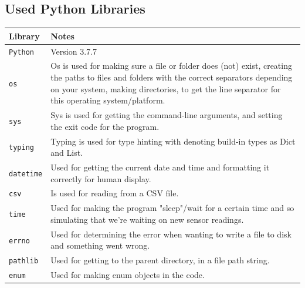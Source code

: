 \documentclass[a4paper]{article}
\newcommand{\arraystrechlength}{1.5}
\begin{document}
\subsection{Used Python Libraries}
\label{appendix:python-libs}
\begin{table}[h]
{\renewcommand{\arraystretch}{\arraystrechlength}
    \begin{tabular}{ | m{100pt} | m{230pt} | }
    
    \hline
    \rowcolor{vu-blue}
    \textcolor{vu-white}{\textbf{Library}} & \textcolor{vu-white}{\textbf{Notes}} \\ \hline
    
    \texttt{Python} &
    Version 3.7.7
    \\ \hline
    
    \texttt{os} &
    Os is used for making sure a file or folder does (not) exist, creating the paths to files and folders with the correct separators depending on your system, making directories, to get the line separator for this operating system/platform.
    \\ \hline
    
    \texttt{sys} &
    Sys is used for getting the command-line arguments, and setting the exit code for the program.
    \\ \hline
    
    \texttt{typing} &
    Typing is used for type hinting with denoting build-in types as Dict and List.
    \\ \hline
    
    \texttt{datetime} &
    Used for getting the current date and time and formatting it correctly for human display.
    \\ \hline
    
    \texttt{csv} &
    Is used for reading from a CSV file.
    \\ \hline
    
    \texttt{time} &
    Used for making the program "sleep"/wait for a certain time and so simulating that we're waiting on new sensor readings.
    \\ \hline
    
    \texttt{errno} &
    Used for determining the error when wanting to write a file to disk and something went wrong.
    \\ \hline
    
    \texttt{pathlib} &
    Used for getting to the parent directory, in a file path string.
    \\ \hline
    
    \texttt{enum} &
    Used for making enum objects in the code.
    \\ \hline
    
    \end{tabular}
}
\end{table}
\end{document}
